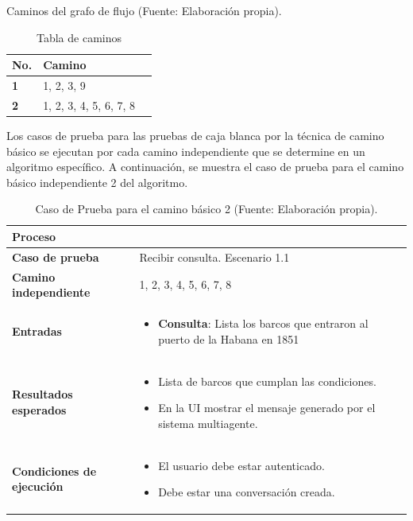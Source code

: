 \begin{table}[h]
	\centering
	\caption{Caminos del grafo de flujo (Fuente: Elaboración propia).}
	\label{tab:caminos-grafo}
	\begin{tabular}{|>{\bfseries}m{5cm}|m{4cm}|m{4cm}|}
		\hline
		\textbf{No.} & \textbf{Camino} \\ \hline
		1            & 1, 2, 3, 9      \\ \hline
		2            & 1, 2, 3, 4, 5, 6, 7, 8   \\ \hline
	\end{tabular}
	\caption{Tabla de caminos}
	\label{tab:caminos}
\end{table}

Los casos de prueba para las pruebas de caja blanca por la técnica de camino básico se ejecutan por cada
camino independiente que se determine en un algoritmo específico. A continuación, se muestra el caso de
prueba para el camino básico independiente 2 del algoritmo.

\begin{longtable}{|p{4cm}|p{11cm}|}
	\caption{Caso de Prueba para el camino básico 2 (Fuente: Elaboración propia).}
	\label{tab:caminos-grafo}\\
	\hline
	\textbf{Proceso} &  \\ \hline
	\textbf{Caso de prueba} & Recibir consulta. Escenario 1.1 \\ \hline
	\textbf{Camino independiente} & 1, 2, 3, 4, 5, 6, 7, 8 \\ \hline
	\textbf{Entradas} &
	\begin{itemize}
		\item \textbf{Consulta}: Lista los barcos que entraron al puerto de la Habana en 1851
	\end{itemize} \\ \hline
	\textbf{Resultados esperados} &
		\begin{itemize}
			\item Lista de barcos que cumplan las condiciones.
			\item En la UI mostrar el mensaje generado por el sistema multiagente.
		\end{itemize} \\ \hline
		
	\textbf{Condiciones de ejecución} &
	\begin{itemize}
		\item El usuario debe estar autenticado.
		\item Debe estar una conversación creada.
	\end{itemize} \\ \hline
\end{longtable}


